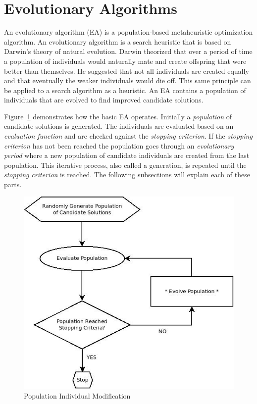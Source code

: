 \section{Evolutionary Algorithms}
\label{sec:ea}

An evolutionary algorithm (EA) is a population-based metaheuristic optimization algorithm. An evolutionary algorithm is a search heuristic that is based on Darwin's theory of natural evolution. Darwin theorized that over a period of time a population of individuals would naturally mate and create offspring that were better than themselves. He suggested that not all individuals are created equally and that eventually the weaker individuals would die off. This same principle can be applied to a search algorithm as a heuristic. An EA contains a population of individuals that are evolved to find improved candidate solutions.

Figure~\ref{fig:evolutionaryFlowchart} demonstrates how the basic EA operates. Initially a \textit{population} of candidate solutions is generated. The individuals are evaluated based on an \textit{evaluation function} and are checked against the \textit{stopping criterion}. If the \textit{stopping criterion} has not been reached the population goes through an \textit{evolutionary period} where a new population of candidate individuals are created from the last population. This iterative process, also called a generation, is repeated until the \textit{stopping criterion} is reached. The following subsections will explain each of these parts.

\begin{figure}[H]
	\centering
	\includegraphics[bb=0 0 524 481,scale=0.5]{figures/EA.jpeg}
	\caption{Population Individual Modification}
	\label{fig:evolutionaryFlowchart}
\end{figure}

